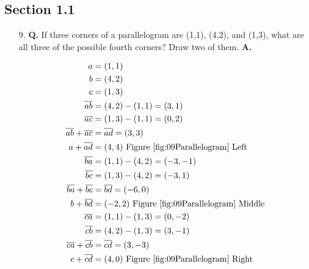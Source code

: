\documentclass[main.tex]{subfiles}
\begin{document}
\subsection{Section 1.1}

    \begin{enumerate}
        \item [9.] \textbf{Q.} If three corners of a parallelogram are (1,1), (4,2), and (1,3), what are all three of the possible fourth corners? Draw two of them. \textbf{A.}
        
        $$
        \begin{aligned}        
        a & = (1,1) \\
        b & = (4,2) \\
        c & = (1,3) \\
        \overline{ab} & = (4,2) - (1,1) = (3,1) \\
        \overline{ac} & = (1,3) - (1,1) = (0,2) \\
        \overline{ab} + \overline{ac} & = \overline{ad} = (3,3)\\
        a + \overline{ad} & = (4,4) \text{ Figure \ref{fig:09Parallelogram} Left}\\
        \overline{ba} & = (1,1) - (4,2) = (-3,-1) \\
        \overline{bc} & = (1,3) - (4,2) = (-3,1) \\
        \overline{ba} + \overline{bc} & = \overline{bd} = (-6,0)\\
        b + \overline{bd} & = (-2,2) \text{ Figure \ref{fig:09Parallelogram} Middle}\\
        \overline{ca} & = (1,1) - (1,3) = (0,-2) \\
        \overline{cb} & = (4,2) - (1,3) = (3,-1) \\
        \overline{ca} + \overline{cb} & = \overline{cd} = (3,-3)\\
        c + \overline{cd} & = (4,0) \text{ Figure \ref{fig:09Parallelogram} Right}
        \end{aligned}
        $$
        

\end{enumerate}
\end{document}
